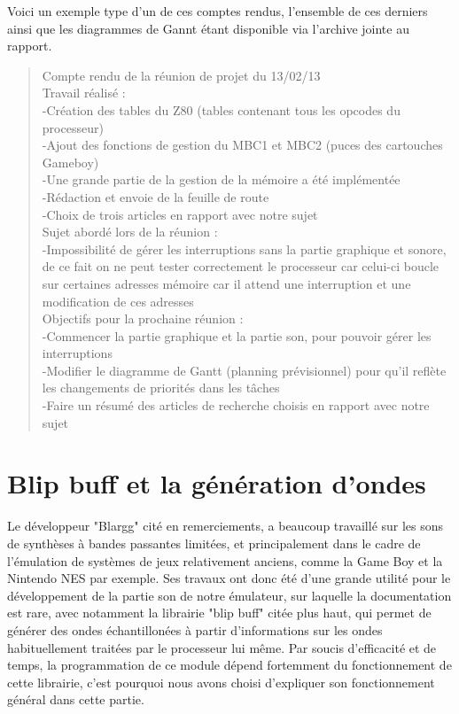 \documentclass{report}
\begin{document}
Voici un exemple type d'un de ces comptes rendus, l'ensemble de ces derniers ainsi que les diagrammes de Gannt étant disponible via l'archive jointe au rapport.
\begin{quotation}
Compte rendu de la réunion de projet du 13/02/13\\
Travail réalisé :\\
	-Création des tables du Z80 (tables contenant tous les opcodes du processeur)\\
	-Ajout des fonctions de gestion du MBC1 et MBC2 (puces des cartouches Gameboy)\\
	-Une grande partie de la gestion de la mémoire a été implémentée\\
	-Rédaction et envoie de la feuille de route\\
	-Choix de trois articles en rapport avec notre sujet\\
Sujet abordé lors de la réunion :\\
	-Impossibilité de gérer les interruptions sans la partie graphique et sonore, de ce fait on ne peut tester correctement le processeur car celui-ci boucle sur certaines adresses mémoire car il attend une interruption et une modification de ces adresses\\
Objectifs pour la prochaine réunion :\\
	-Commencer la partie graphique et la partie son, pour pouvoir gérer les interruptions\\
	-Modifier le diagramme de Gantt (planning prévisionnel) pour qu’il reflète les changements de priorités dans les tâches\\
	-Faire un résumé des articles de recherche choisis en rapport avec notre sujet\\

\end{quotation}

\chapter{Blip buff et la génération d'ondes}
Le développeur "Blargg" cité en remerciements, a beaucoup travaillé sur les sons de synthèses à bandes passantes limitées, et principalement dans le cadre de l'émulation de systèmes de jeux relativement anciens, comme la Game Boy et la Nintendo NES par exemple. Ses travaux ont donc été d'une grande utilité pour le développement de la partie son de notre émulateur, sur laquelle la documentation est rare, avec notamment la librairie "blip buff" citée plus haut, qui permet de générer des ondes échantillonées à partir d'informations sur les ondes habituellement traitées par le processeur lui même. Par soucis d'efficacité et de temps, la programmation de ce module dépend fortemment du fonctionnement de cette librairie, c'est pourquoi nous avons choisi d'expliquer son fonctionnement général dans cette partie.\\
\end{document}
